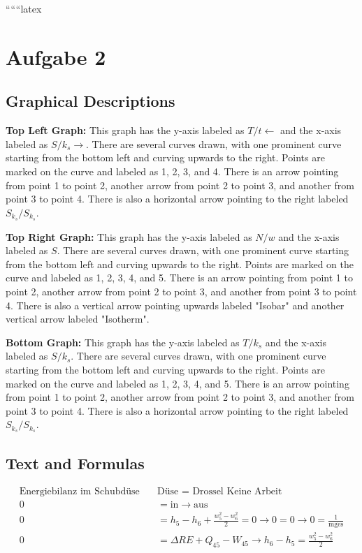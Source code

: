 
``````latex


\section*{Aufgabe 2}

\subsection*{Graphical Descriptions}

\textbf{Top Left Graph:}
This graph has the y-axis labeled as $T/t\leftarrow$ and the x-axis labeled as $S/k_{s} \rightarrow$. There are several curves drawn, with one prominent curve starting from the bottom left and curving upwards to the right. Points are marked on the curve and labeled as 1, 2, 3, and 4. There is an arrow pointing from point 1 to point 2, another arrow from point 2 to point 3, and another from point 3 to point 4. There is also a horizontal arrow pointing to the right labeled $S_{k_{s}}/S_{k_{s}}$.

\textbf{Top Right Graph:}
This graph has the y-axis labeled as $N/w$ and the x-axis labeled as $S$. There are several curves drawn, with one prominent curve starting from the bottom left and curving upwards to the right. Points are marked on the curve and labeled as 1, 2, 3, 4, and 5. There is an arrow pointing from point 1 to point 2, another arrow from point 2 to point 3, and another from point 3 to point 4. There is also a vertical arrow pointing upwards labeled "Isobar" and another vertical arrow labeled "Isotherm".

\textbf{Bottom Graph:}
This graph has the y-axis labeled as $T/k_{s}$ and the x-axis labeled as $S/k_{s}$. There are several curves drawn, with one prominent curve starting from the bottom left and curving upwards to the right. Points are marked on the curve and labeled as 1, 2, 3, 4, and 5. There is an arrow pointing from point 1 to point 2, another arrow from point 2 to point 3, and another from point 3 to point 4. There is also a horizontal arrow pointing to the right labeled $S_{k_{s}}/S_{k_{s}}$.

\subsection*{Text and Formulas}

\begin{align*}
\text{Energiebilanz im Schubdüse} \quad & \text{Düse = Drossel Keine Arbeit} \\
0 &= \text{in} \rightarrow \text{aus} \\
0 &= h_5 - h_6 + \frac{w_5^2 - w_6^2}{2} = 0 \rightarrow 0 = 0 \rightarrow 0 = \frac{1}{\text{mges}} \\
0 &= \Delta RE + Q_{45} - W_{45} \rightarrow h_6 - h_5 = \frac{w_5^2 - w_6^2}{2}
\end{align*}

